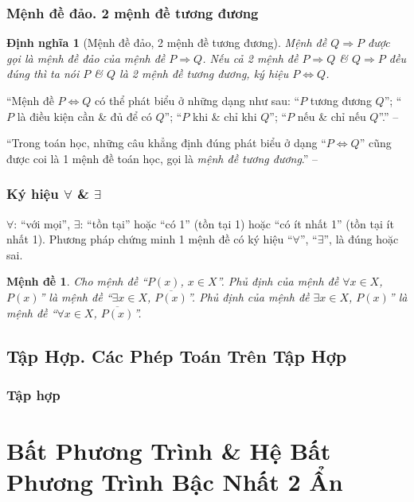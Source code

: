 \documentclass[oneside]{book}
\numberwithin{equation}{section}
\newtheorem{dinhnghia}{Định nghĩa}[section]
\newtheorem{menhde}{Mệnh đề}[section]
\begin{document}
\subsection{Mệnh đề đảo. 2 mệnh đề tương đương}

\begin{dinhnghia}[Mệnh đề đảo, 2 mệnh đề tương đương]
	Mệnh đề $Q\Rightarrow P$ được gọi là \emph{mệnh đề đảo} của mệnh đề $P\Rightarrow Q$. Nếu cả 2 mệnh đề $P\Rightarrow Q$ \& $Q\Rightarrow P$ đều đúng thì ta nói $P$ \& $Q$ là \emph{2 mệnh đề tương đương}, ký hiệu $P\Leftrightarrow Q$.
\end{dinhnghia}
``Mệnh đề $P\Leftrightarrow Q$ có thể phát biểu ở những dạng như sau: ``$P$ tương đương $Q$''; ``$P$ là điều kiện cần \& đủ để có $Q$''; ``$P$ khi \& chỉ khi $Q$''; ``$P$ nếu \& chỉ nếu $Q$''.'' -- \cite[p. 8]{SGK_Toan_10_Canh_Dieu_tap_1}

``Trong toán học, những câu khẳng định đúng phát biểu ở dạng ``$P\Leftrightarrow Q$'' cũng được coi là 1 mệnh đề toán học, gọi là \textit{mệnh đề tương đương}.'' -- \cite[p. 9]{SGK_Toan_10_Canh_Dieu_tap_1}

\subsection{Ký hiệu $\forall$ \& $\exists$}
$\forall$: ``với mọi'', $\exists$: ``tồn tại'' hoặc ``có 1'' (tồn tại 1) hoặc ``có ít nhất 1'' (tồn tại ít nhất 1). Phương pháp chứng minh 1 mệnh đề có ký hiệu ``$\forall$'', ``$\exists$'', là đúng hoặc sai.

\begin{menhde}
	Cho mệnh đề ``$P(x)$, $x\in X$''. Phủ định của mệnh đề $\forall x\in X$, $P(x)$'' là mệnh đề ``$\exists x\in X$, $\overline{P(x)}$''. Phủ định của mệnh đề $\exists x\in X$, $P(x)$'' là mệnh đề ``$\forall x\in X$, $\overline{P(x)}$''.
\end{menhde}

\section{Tập Hợp. Các Phép Toán Trên Tập Hợp}

\subsection{Tập hợp}



\chapter{Bất Phương Trình \& Hệ Bất Phương Trình Bậc Nhất 2 Ẩn}
\end{document}
